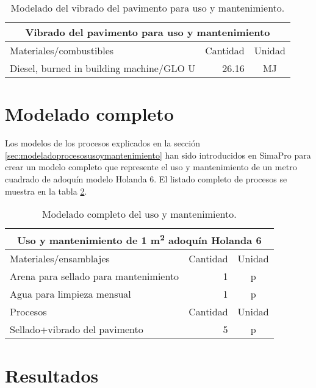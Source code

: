 \begin{table}[!htb]
\centering
\begin{tabular}{p{8cm}rc}
\toprule
\multicolumn{3}{c}{Vibrado del pavimento para uso y mantenimiento}\\
\midrule
Materiales/combustibles & Cantidad & Unidad\\
\midrule
Diesel, burned in building machine/GLO U & 26.16 & \si{MJ}\\
\bottomrule
\end{tabular}
\caption{Modelado del vibrado del pavimento para uso y mantenimiento.}
\label{modeladovibradouso}
\end{table}

\section{Modelado completo}

Los modelos de los procesos explicados en la sección \ref{sec:modeladoprocesosusoymantenimiento} han sido introducidos en SimaPro para crear un modelo completo que represente el uso y mantenimiento de un metro cuadrado de adoquín modelo Holanda 6. El listado completo de procesos se muestra en la tabla \ref{modeladocompletousoymantenimiento}.

\begin{table}[!htb]
\centering
\begin{tabular}{p{8cm}rc}
\toprule
\multicolumn{3}{c}{Uso y mantenimiento de 1 \si{m^2} adoquín Holanda 6}\\
\midrule
Materiales/ensamblajes & Cantidad & Unidad\\
\midrule
Arena para sellado para mantenimiento & 1 & p\\
Agua para limpieza mensual & 1 & p\\
\midrule
Procesos & Cantidad & Unidad\\
\midrule
Sellado+vibrado del pavimento & 5 & p\\
\bottomrule
\end{tabular}
\caption{Modelado completo del uso y mantenimiento.}
\label{modeladocompletousoymantenimiento}
\end{table}

\section{Resultados}
